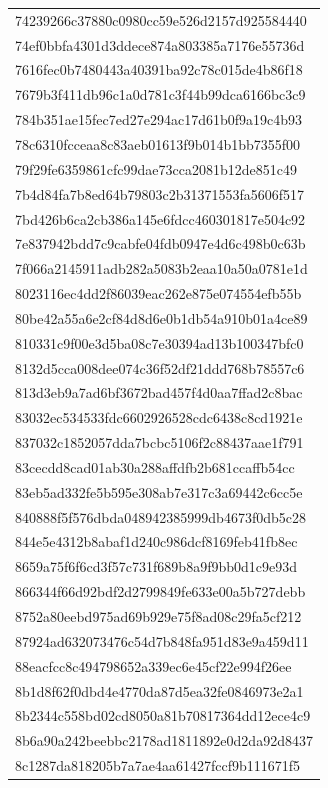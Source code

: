 \begin{tabular}{l}
74239266c37880c0980cc59e526d2157d925584440 \\
74ef0bbfa4301d3ddece874a803385a7176e55736d \\
7616fec0b7480443a40391ba92c78c015de4b86f18 \\
7679b3f411db96c1a0d781c3f44b99dca6166bc3c9 \\
784b351ae15fec7ed27e294ac17d61b0f9a19c4b93 \\
78c6310fcceaa8c83aeb01613f9b014b1bb7355f00 \\
79f29fe6359861cfc99dae73cca2081b12de851c49 \\
7b4d84fa7b8ed64b79803c2b31371553fa5606f517 \\
7bd426b6ca2cb386a145e6fdcc460301817e504c92 \\
7e837942bdd7c9cabfe04fdb0947e4d6c498b0c63b \\
7f066a2145911adb282a5083b2eaa10a50a0781e1d \\
8023116ec4dd2f86039eac262e875e074554efb55b \\
80be42a55a6e2cf84d8d6e0b1db54a910b01a4ce89 \\
810331c9f00e3d5ba08c7e30394ad13b100347bfc0 \\
8132d5cca008dee074c36f52df21ddd768b78557c6 \\
813d3eb9a7ad6bf3672bad457f4d0aa7ffad2c8bac \\
83032ec534533fdc6602926528cdc6438c8cd1921e \\
837032c1852057dda7bcbc5106f2c88437aae1f791 \\
83cecdd8cad01ab30a288affdfb2b681ccaffb54cc \\
83eb5ad332fe5b595e308ab7e317c3a69442c6cc5e \\
840888f5f576dbda048942385999db4673f0db5c28 \\
844e5e4312b8abaf1d240c986dcf8169feb41fb8ec \\
8659a75f6f6cd3f57c731f689b8a9f9bb0d1c9e93d \\
866344f66d92bdf2d2799849fe633e00a5b727debb \\
8752a80eebd975ad69b929e75f8ad08c29fa5cf212 \\
87924ad632073476c54d7b848fa951d83e9a459d11 \\
88eacfcc8c494798652a339ec6e45cf22e994f26ee \\
8b1d8f62f0dbd4e4770da87d5ea32fe0846973e2a1 \\
8b2344c558bd02cd8050a81b70817364dd12ece4c9 \\
8b6a90a242beebbc2178ad1811892e0d2da92d8437 \\
8c1287da818205b7a7ae4aa61427fccf9b111671f5 \\

\end{tabular}
